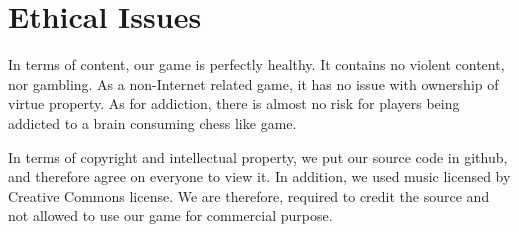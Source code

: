 \section{Ethical Issues}
In terms of content, our game is perfectly healthy. It contains no violent content, nor gambling. As a non-Internet related game, it has no issue with ownership of virtue property. As for addiction, there is almost no risk for players being addicted to a brain consuming chess like game.

In terms of copyright and intellectual property, we put our source code in github, and therefore agree on everyone to view it. In addition, we used music licensed by Creative Commons license. We are therefore, required to credit the source and not allowed to use our game for commercial purpose.